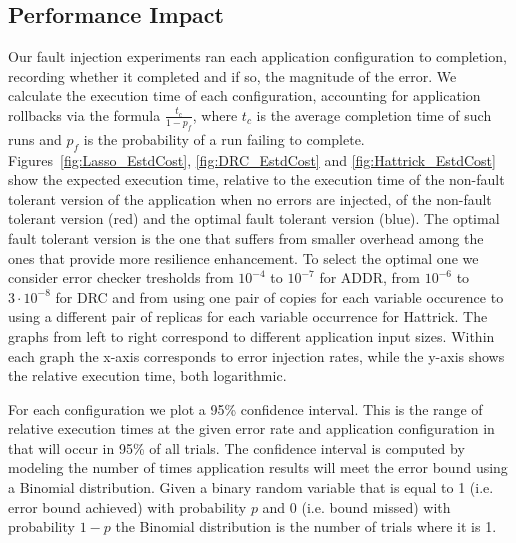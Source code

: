 \documentclass{sig-alternate}
\newcommand{\sui}[1]{%
  \textcolor{green}{SC - #1}
}
\newcommand{\greg}[1]{%
  \textcolor{blue}{GB: #1}
}
\begin{document}

\subsection{Performance Impact}
\label{sec:eval:perf}

Our fault injection experiments ran each application configuration to completion, recording whether it completed and if so, the magnitude of the error.
We calculate the execution time of each configuration, accounting for application rollbacks via the formula $\frac{t_c}{1-p_f}$, where $t_c$ is the average completion time of such runs and $p_f$ is the probability of a run failing to complete.
Figures~\ref{fig:Lasso_EstdCost}, \ref{fig:DRC_EstdCost} and \ref{fig:Hattrick_EstdCost} show the expected execution time, relative to the execution time of the non-fault tolerant version of the application when no errors are injected, of the non-fault tolerant version (red) and the optimal fault tolerant version (blue).
The optimal fault tolerant version is the one that suffers from smaller overhead among the ones that provide more resilience enhancement.
To select the optimal one we consider error checker tresholds from $10^{-4}$ to $10^{-7}$ for ADDR, from $10^{-6}$ to $3 \cdot 10^{-8}$ for DRC and from using one pair of copies for each variable occurence to using a different pair of replicas for each variable occurrence for Hattrick.
The graphs from left to right correspond to different application input sizes.
Within each graph the x-axis corresponds to error injection rates, while the y-axis shows the relative execution time, both logarithmic.

For each configuration we plot a 95\% confidence interval.
This is the range of relative execution times at the given error rate and application configuration in that will occur in 95\% of all trials.
The confidence interval is computed by modeling the number of times application results will meet the error bound using a Binomial distribution.
Given a binary random variable that is equal to 1 (i.e. error bound achieved) with probability $p$ and 0 (i.e. bound missed) with probability $1-p$ the Binomial distribution is the number of trials where it is 1.
\end{document}
